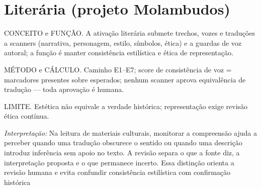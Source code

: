 \section{Literária (projeto Molambudos)}
\begin{descricao}
CONCEITO e FUNÇÃO. A ativação literária submete trechos, vozes e traduções a
scanners (narrativa, personagem, estilo, símbolos, ética) e a guardas de voz
autoral; a função é manter consistência estilística e ética de representação.
\end{descricao}
\begin{metodo}
MÉTODO e CÁLCULO. Caminho E1--E7; score de consistência de voz = marcadores
presentes sobre esperados; nenhum scanner aprova equivalência de tradução —
toda aprovação é humana.
\end{metodo}
\begin{aviso}
LIMITE. Estética não equivale a verdade histórica; representação exige
revisão ética contínua.
\end{aviso}
\noindent\textit{Interpretação:} Na leitura de materiais culturais, monitorar a compreensão ajuda a perceber quando uma tradução obscurece o sentido ou quando uma descrição introduz inferência sem apoio no texto. A revisão separa o que a fonte diz, a interpretação proposta e o que permanece incerto. Essa distinção orienta a revisão humana e evita confundir consistência estilística com confirmação histórica  %
